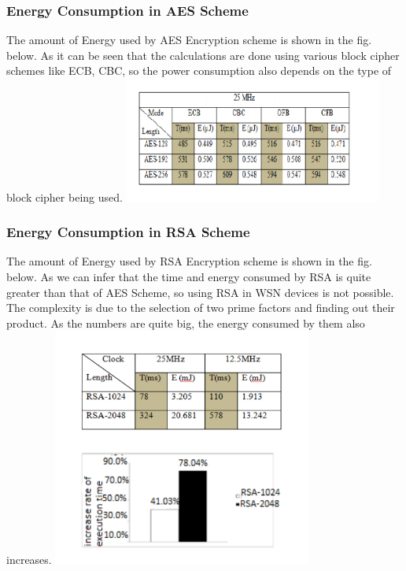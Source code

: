 \documentclass[conference]{IEEEtran}
\begin{document}
\subsubsection{Energy Consumption in AES Scheme}
The amount of Energy used by AES Encryption scheme is shown in the fig. below. As it can be seen that the calculations are done using various block cipher schemes like ECB, CBC, so the power consumption also depends on the type of block cipher being used.
\includegraphics[width=8.5cm]{energy_aes}

\subsubsection{Energy Consumption in RSA Scheme}
The amount of Energy used by RSA Encryption scheme is shown in the fig. below. As we can infer that the time and energy consumed by RSA is quite greater than that of AES Scheme, so using RSA in WSN devices is not possible. The complexity is due to the selection of two prime factors and finding out their product. As the numbers are quite big, the energy consumed by them also increases.
\includegraphics[width=8.5cm]{energy_rsa}
\end{document}
